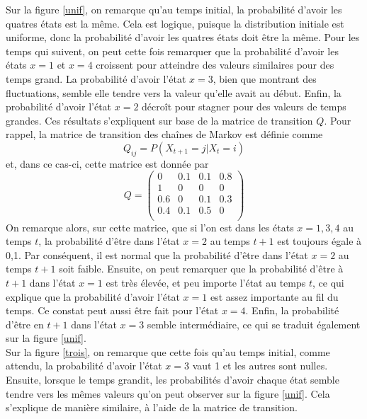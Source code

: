 \documentclass[a4paper, 11pt]{article}
\begin{document}
Sur la figure \ref{unif}, on remarque qu'au temps initial, la probabilité d'avoir les quatres états est la même. Cela est logique, puisque la distribution initiale est uniforme, donc la probabilité d'avoir les quatres états doit être la même. Pour les temps qui suivent, on peut cette fois remarquer que la probabilité d'avoir les états $x=1$ et $x=4$ croissent pour atteindre des valeurs similaires pour des temps grand. La probabilité d'avoir l'état $x=3$, bien que montrant des fluctuations, semble elle tendre vers la valeur qu'elle avait au début. Enfin, la probabilité d'avoir l'état $x=2$ décroît pour stagner pour des valeurs de temps grandes. Ces résultats s'expliquent sur base de la matrice de transition $Q$. Pour rappel, la matrice de transition des chaînes de Markov est définie comme
\begin{equation}
    Q_{ij}=P(X_{t+1}=j|X_t=i)
\end{equation}
et, dans ce cas-ci, cette matrice est donnée par
\begin{equation}
    Q=\begin{pmatrix}
    0 & 0.1 & 0.1 & 0.8 \\
    1 & 0 & 0 & 0 \\
    0.6 & 0 & 0.1 & 0.3 \\
    0.4 & 0.1 & 0.5 & 0 \\ 
    \end{pmatrix}
\end{equation}
On remarque alors, sur cette matrice, que si l'on est dans les états $x=1,3,4$ au temps $t$, la probabilité d'être dans l'état $x=2$ au temps $t+1$ est toujours égale à 0,1. Par conséquent, il est normal que la probabilité d'être dans l'état $x=2$ au temps $t+1$ soit faible. Ensuite, on peut remarquer que la probabilité d'être à $t+1$ dans l'état $x=1$ est très élevée, et peu importe l'état au temps $t$, ce qui explique que la probabilité d'avoir l'état $x=1$ est assez importante au fil du temps. Ce constat peut aussi être fait pour l'état $x=4$. Enfin, la probabilité d'être en $t+1$ dans l'état $x=3$ semble intermédiaire, ce qui se traduit également sur la figure \ref{unif}.\\

Sur la figure \ref{trois}, on remarque que cette fois qu'au temps initial, comme attendu, la probabilité d'avoir l'état $x=3$ vaut 1 et les autres sont nulles. Ensuite, lorsque le temps grandit, les probabilités d'avoir chaque état semble tendre vers les mêmes valeurs qu'on peut observer sur la figure \ref{unif}. Cela s'explique de manière similaire, à l'aide de la matrice de transition.
\newpage
\end{document}
